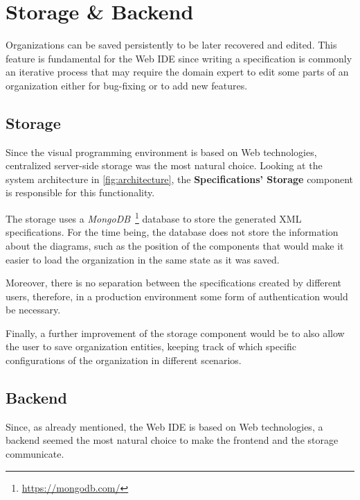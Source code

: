 \begin{figure}
    
\end{figure}

\begin{figure}
    
\end{figure}

\section{Storage \& Backend}
Organizations can be saved persistently to be later recovered and edited.
This feature is fundamental for the Web IDE since writing a specification is commonly an iterative process that may require the domain expert to edit some parts of an organization either for bug-fixing or to add new features.

\subsection{Storage}

Since the visual programming environment is based on Web technologies, centralized server-side storage was the most natural choice.
Looking at the system architecture in \cref{fig:architecture}, the \textbf{Specifications' Storage} component is responsible for this functionality.

The storage uses a \textit{MongoDB}~\footnote{\url{https://mongodb.com/}} database to store the generated XML specifications.
For the time being, the database does not store the information about the diagrams, such as the position of the components that would make it easier to load the organization in the same state as it was saved.

Moreover, there is no separation between the specifications created by different users, therefore, in a production environment some form of authentication would be necessary.

Finally, a further improvement of the storage component would be to also allow the user to save organization entities, keeping track of which specific configurations of the organization in different scenarios.

\subsection{Backend}
Since, as already mentioned, the Web IDE is based on Web technologies, a backend seemed the most natural choice to make the frontend and the storage communicate.

